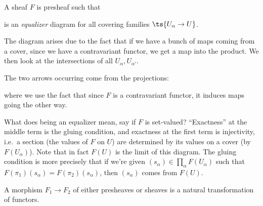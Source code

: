 \begin{definition}[Sheaf]

A sheaf \(F\) is presheaf such that

\begin{center}
\end{center}

is an \emph{equalizer} diagram for all covering families
\(\ts{U_\alpha \to U}\).

\end{definition}

\begin{remark}

The diagram arises due to the fact that if we have a bunch of maps
coming from a cover, since we have a contravariant functor, we get a map
into the product. We then look at the intersections of all
\(U_{\alpha}, U_{\alpha'}\).

The two arrows occurring come from the projections:

\begin{center}
\end{center}

where we use the fact that since \(F\) is a contravariant functor, it
induces maps going the other way.

What does being an equalizer mean, say if \(F\) is set-valued?
``Exactness'' at the middle term is the gluing condition, and exactness
at the first term is injectivity, i.e.~a section (the values of \(F\) on
\(U\)) are determined by its values on a cover (by \(F(U_\alpha)\)).
Note that in fact \(F(U)\) is the limit of this diagram. The gluing
condition is more precisely that if we're given
\((s_\alpha) \in \prod_\alpha F(U_\alpha)\) such that
\(F(\pi_1)(s_\alpha) = F(\pi_2)(s_\alpha)\), then \((s_\alpha)\) comes
from \(F(U)\).

\end{remark}

\begin{definition}

A morphism \(F_1\to F_2\) of either presheaves or sheaves is a natural
transformation of functors.

\end{definition}


